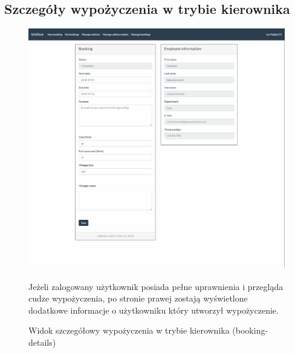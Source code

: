 \documentclass[eng,printmode,openany]{mgr}
\begin{document}
\subsection{Szczegóły wypożyczenia w trybie kierownika}
\begin{figure}[H]
	\centering
	\includegraphics[width=\textwidth]{images/views/booking-detail-manager.png}
	\caption{Widok szczegółowy wypożyczenia w trybie kierownika (booking-details)}
	\small 
	Jeżeli zalogowany użytkownik posiada pełne uprawnienia i przegląda cudze wypożyczenia, po stronie prawej zostają wyświetlone dodatkowe informacje o użytkowniku który utworzył wypożyczenie.
\end{figure}
\end{document}
